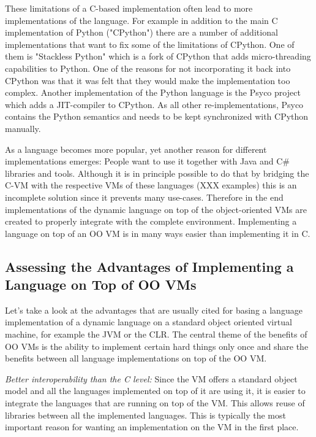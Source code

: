 \documentclass{llncs}
\begin{document}


These limitations of a C-based implementation often lead to more
implementations of the language. For example in addition to the main C
implementation of Python ("CPython") there are a number of additional
implementations that want to fix some of the limitations of CPython. One of
them is "Stackless Python" which is a fork of CPython that adds micro-threading
capabilities to Python. One of the reasons for not incorporating it back into
CPython was that it was felt that they would make the implementation too
complex. Another implementation of the Python language is the Psyco project
which adds a JIT-compiler to CPython. As all other re-implementations, Psyco
contains the Python semantics and needs to be kept synchronized with CPython
manually.


As a language becomes more popular, yet another reason for different
implementations emerges: People want to use it together with Java and C\#
libraries and tools. Although it is in principle possible to do that by
bridging the C-VM with the respective VMs of these languages (XXX examples)
this is an incomplete solution since it prevents many use-cases.
Therefore in the end implementations of the dynamic language on top of the
object-oriented VMs are created to properly integrate with the complete
environment. Implementing a language on top of an OO VM is in many ways easier
than implementing it in C.


\subsection{Assessing the Advantages of Implementing a Language on Top of OO
VMs}

Let's take a look at the advantages that are usually cited for basing a
language implementation of a dynamic language on a standard object oriented
virtual machine, for example the JVM or the CLR. The central theme of the
benefits  of OO VMs is the ability to implement certain hard things only once
and share the benefits between all language implementations on top of the OO VM.

\emph{Better interoperability than the C level:} Since the VM offers a standard
object model and all the languages implemented on top of it are using it, it is
easier to integrate the languages that are running on top of the VM. This
allows reuse of libraries between all the implemented languages. This is
typically the most important reason for wanting an implementation on the VM in
the first place.
\end{document}
